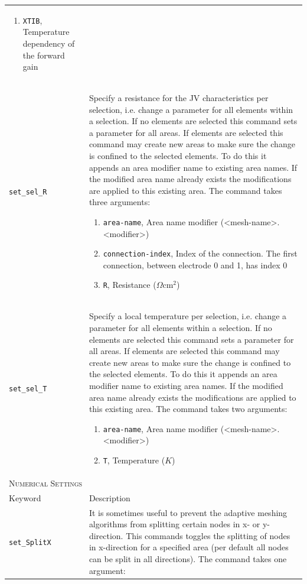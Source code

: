 \documentclass[noshowpacs,preprintnumbers,amsmath,amssymb, letter]{revtex4}
\begin{document}
\begin{longtable}{p{}p{}}
\begin{enumerate}
\item \texttt{XTIB},  Temperature dependency of the forward gain 
\end{enumerate}\\
\texttt{set\_sel\_R}	&  Specify a resistance for the JV characteristics per selection, i.e. change a parameter for all elements within a selection. If no elements are selected this command sets a parameter for all areas. If elements are selected this command may create new areas to make sure the change is confined to the selected elements. To do this it appends an area modifier name to existing area names. If the modified area name already exists the modifications are applied to this existing area. The command takes three arguments:
\begin{enumerate}
\item \texttt{area-name}, Area name modifier (\textless mesh-name\textgreater .\textless modifier\textgreater )
\item \texttt{connection-index}, Index of the connection. The first connection, between electrode 0 and 1,  has index 0
\item \texttt{R}, Resistance ($\Omega \text{cm}^2$)
\end{enumerate}\\
\texttt{set\_sel\_T}	&  Specify a local temperature per selection, i.e. change a parameter for all elements within a selection. If no elements are selected this command sets a parameter for all areas. If elements are selected this command may create new areas to make sure the change is confined to the selected elements. To do this it appends an area modifier name to existing area names. If the modified area name already exists the modifications are applied to this existing area. The command takes two arguments:
\begin{enumerate}
\item \texttt{area-name}, Area name modifier (\textless mesh-name\textgreater .\textless modifier\textgreater )
\item \texttt{T}, Temperature ($K$)
\end{enumerate}\\
\multicolumn{2}{l}{\textsc{Numerical Settings}} \\*
\hline
Keyword & Description \\
\texttt{set\_SplitX}	&  It is sometimes useful to prevent the adaptive meshing algorithms from splitting certain nodes in x- or y-direction. This commands toggles the splitting of nodes in x-direction for a specified area (per default all nodes can be split in all directions). The command takes one argument:

\end{longtable}
\end{document}
